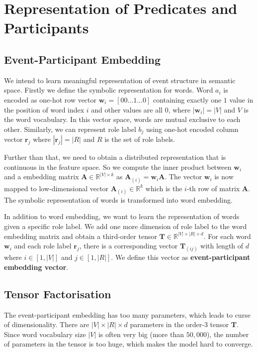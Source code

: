 \documentclass[a4paper]{article}
\begin{document}
\section{Representation of Predicates and Participants}
\subsection{Event-Participant Embedding} \label{sec:epe}
We intend to learn meaningful representation of event structure in semantic space. Firstly we define the symbolic representation for words. Word $a_i$ is encoded as one-hot row vector $\mathbf{w}_i = [00...1...0]$ containing exactly one $1$ value in the position of word index $i$ and other values are all $0$, where $|\mathbf{w}_i| = |V|$ and $V$ is the word vocabulary. In this vector space, words are mutual exclusive to each other. Similarly, we can represent role label $b_j$ using one-hot encoded column vector $\mathbf{r}_j$ where $|\mathbf{r}_j| = |R|$ and $R$ is the set of role labels. 

Further than that, we need to obtain a distributed representation that is continuous in the feature space. So we compute the inner product between $\mathbf{w}_i$ and a embedding matrix $\mathbf{A} \in \mathbb{R}^{|V| \times k}$ as $\mathbf{A}_{(i)} = \mathbf{w}_i \mathbf{A}$. The vector $\mathbf{w}_i$ is now mapped to low-dimensional vector $\mathbf{A}_{(i)} \in \mathbb{R}^k$ which is the $i$-th row of matrix $\mathbf{A}$. The symbolic representation of words is transformed into word embedding. 

In addition to word embedding, we want to learn the representation of words given a specific role label. We add one more dimension of role label to the word embedding matrix and obtain a third-order tensor $\mathbf{T} \in \mathbb{R}^{|V| \times |R| \times d}$. For each word $\mathbf{w}_i$ and each role label $\mathbf{r}_j$, there is a corresponding vector $\mathbf{T}_{(ij)}$ with length of $d$ where $i \in [1, |V|]$ and $j \in [1, |R|]$. We define this vector as \textbf{event-participant embedding vector}. 


\subsection{Tensor Factorisation} \label{sec:tf}
The event-participant embedding has too many parameters, which leads to curse of dimensionality. There are $|V| \times |R| \times d$ parameters in the order-3 tensor $\mathbf{T}$. Since word vocabulary size $|V|$ is often very big (more than $50,000$), the number of parameters in the tensor is too huge, which makes the model hard to converge. 
\end{document}
